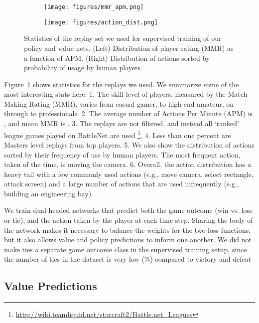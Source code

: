 \documentclass{article}
\begin{document}
\begin{figure}[htp]
    \centering
    \begin{subfigure}{.5\textwidth}
      \centering
      \texttt{[image: figures/mmr\_apm.png]}
    \end{subfigure}\begin{subfigure}{.5\textwidth}
      \centering
      \texttt{[image: figures/action\_dist.png]}
    \end{subfigure}
    \caption{Statistics of the replay set we used for supervised training of our policy and value nets.
    (Left) Distribution of player rating (MMR) as a function of APM.
    (Right) Distribution of actions sorted by probability of usage by human players.
    }
    \label{fig:replay_stats}
\end{figure}

Figure~\ref{fig:replay_stats} shows statistics for the replays we used. We summarize some of the most interesting stats here: 1. The skill level of players, measured by the Match Making Rating (MMR), varies from casual gamer, to high-end amateur, on through to professionals. 2. The average number of Actions Per Minute (APM) is , and mean MMR is .  3. The replays are not filtered, and instead all `ranked' league games played on BattleNet are used \footnote{\url{http://wiki.teamliquid.net/starcraft2/Battle.net\_Leagues}}.
4. Less than one percent are Masters level replays from top players. 5. We also show the distribution of actions sorted by their frequency of use by human players. The most frequent action, taken  of the time, is moving the camera. 6. Overall, the action distribution has a heavy tail with a few commonly used actions (e.g., move camera, select rectangle,  attack screen) and a large number of actions that are used infrequently (e.g., building an engineering bay).

We train dual-headed networks that predict both the game outcome (win vs. loss or tie), and the action taken by the player at each time step. Sharing the body of the network makes it necessary to balance the weights for the two loss functions, but it also allows value and policy predictions to inform one another. We did not make ties a separate game outcome class in the supervised training setup, since the number of ties in the dataset is very low (\%) compared to victory and defeat

\subsection{Value Predictions}
\end{document}
